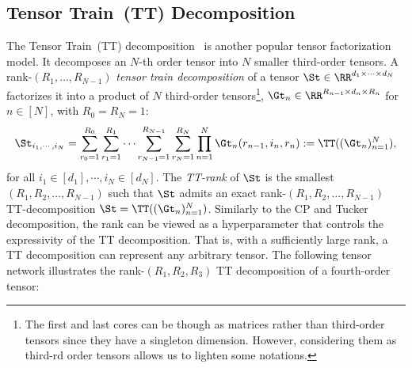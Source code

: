 \subsection{Tensor Train~(TT) Decomposition}\label{sec:tt-decomposition}
The Tensor Train~(TT) decomposition~\citep{oseledets2010approximation} is another popular tensor factorization model. It decomposes an $N$-th order tensor into $N$ smaller third-order tensors. 
A rank-$(R_1,\dots,R_{N-1})$ \textit{tensor train decomposition} of a tensor $\St\in\RR^{d_1\times\cdots\times d_N}$ factorizes it into a product of $N$  third-order tensors\footnote{The first and last cores can be though as matrices rather than third-order tensors since they have a singleton dimension. However, considering them as third-rd order tensors allows us to lighten some notations.}, $\Gt_n\in\RR^{R_{n-1}\times d_n\times R_n}$ for $n\in [N]$, with $R_0=R_N=1$:
$$\St_{i_1,\cdots,i_N}= \sum_{r_0=1}^{R_0}\sum_{r_1=1}^{R_1} \cdots \sum_{r_{N-1}=1}^{R_{N-1}}\sum_{r_N=1}^{R_N} \prod_{n=1}^N\Gt_n(r_{n-1},i_n,r_n) := \TT(({\Gt_n})_{n=1}^N),$$ 
for all $i_1\in[d_1],\cdots,i_N\in[d_N]$.  
The \emph{TT-rank} of $\St$ is the smallest
$(R_1,R_2,\dots,R_{N-1})$ such that $\St$ admits an exact rank-$(R_1,R_2,\dots,R_{N-1})$ TT-decomposition $\St=\TT(({\Gt_n})_{n=1}^N)$.
Similarly to the CP and Tucker decomposition, the rank can be viewed as a hyperparameter that controls the expressivity of the TT decomposition. That is, with a sufficiently large rank, a TT decomposition can represent any arbitrary tensor. The following tensor network illustrates the rank-$(R_1,R_2,R_3)$ TT decomposition of a fourth-order tensor: 

